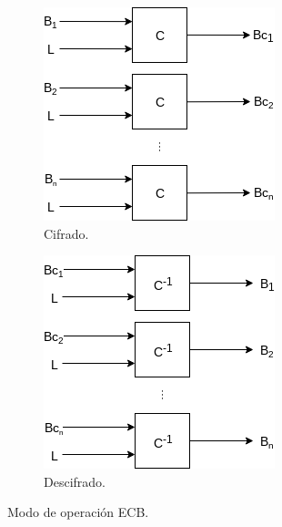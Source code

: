 \begin{figure}[H]
  \centering
  \begin{subfigure}{0.45\textwidth}
      \begin{center}
          \includegraphics[width=0.7\linewidth]
            {contenidos/antecedentes/diagramas/modo_ecb.png}
          \caption{Cifrado.}
      \end{center}
  \end{subfigure}
  \begin{subfigure}{0.45\textwidth}
      \begin{center}
          \includegraphics[width=0.7\linewidth]
            {contenidos/antecedentes/diagramas/modo_ecb_inverso.png}
          \caption{Descifrado.}
      \end{center}
  \end{subfigure}
  \caption{Modo de operación ECB.}
\end{figure}
